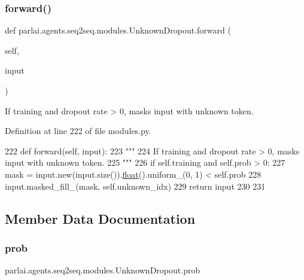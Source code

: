 \subsubsection{\texorpdfstring{forward()}{forward()}}
{\footnotesize\ttfamily def parlai.\+agents.\+seq2seq.\+modules.\+Unknown\+Dropout.\+forward (\begin{DoxyParamCaption}\item[{}]{self,  }\item[{}]{input }\end{DoxyParamCaption})}

\begin{DoxyVerb}If training and dropout rate > 0, masks input with unknown token.
\end{DoxyVerb}
 

Definition at line 222 of file modules.\+py.


\begin{DoxyCode}
222     \textcolor{keyword}{def }forward(self, input):
223         \textcolor{stringliteral}{"""}
224 \textcolor{stringliteral}{        If training and dropout rate > 0, masks input with unknown token.}
225 \textcolor{stringliteral}{        """}
226         \textcolor{keywordflow}{if} self.training \textcolor{keywordflow}{and} self.prob > 0:
227             mask = input.new(input.size()).\hyperlink{namespaceprojects_1_1controllable__dialogue_1_1make__control__dataset_aa2b7207688c641dbc094ab44eca27113}{float}().uniform\_(0, 1) < self.prob
228             input.masked\_fill\_(mask, self.unknown\_idx)
229         \textcolor{keywordflow}{return} input
230 
231 
\end{DoxyCode}


\subsection{Member Data Documentation}
\mbox{\label{classparlai_1_1agents_1_1seq2seq_1_1modules_1_1UnknownDropout_a1a265182c039545be63eb24c57bf3251}} 
\subsubsection{\texorpdfstring{prob}{prob}}
{\footnotesize\ttfamily parlai.\+agents.\+seq2seq.\+modules.\+Unknown\+Dropout.\+prob}



